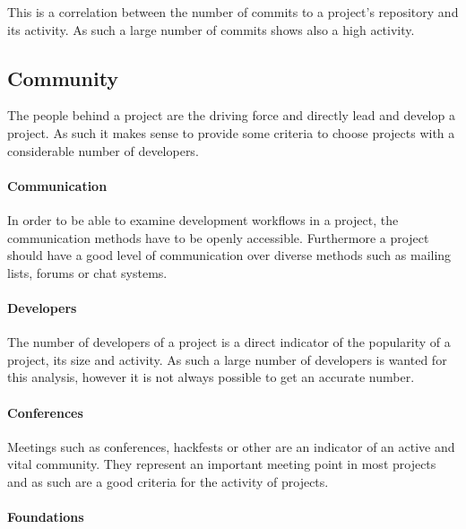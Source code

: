 This is a correlation between the number of commits to a project's repository
and its activity. As such a large number of commits shows also a high
activity.



\subsection{Community} %

The people behind a project are the driving force and directly lead and develop
a project. As such it makes sense to provide some criteria to choose projects
with a considerable number of developers.

\paragraph{Communication} %

In order to be able to examine development workflows in a project,
the communication methods have to be openly accessible. Furthermore a project
should have a good level of communication over diverse methods such as mailing
lists, forums or chat systems.


\paragraph{Developers} %

The number of developers of a project is a direct indicator of the popularity
of a project, its size and activity. As such a large number of developers is
wanted for this analysis, however it is not always possible to get an accurate
number.


\paragraph{Conferences} %

Meetings such as conferences, hackfests or other are an indicator of an active
and vital community. They represent an important meeting point in most projects
and as such are a good criteria for the activity of projects.


\paragraph{Foundations} %

